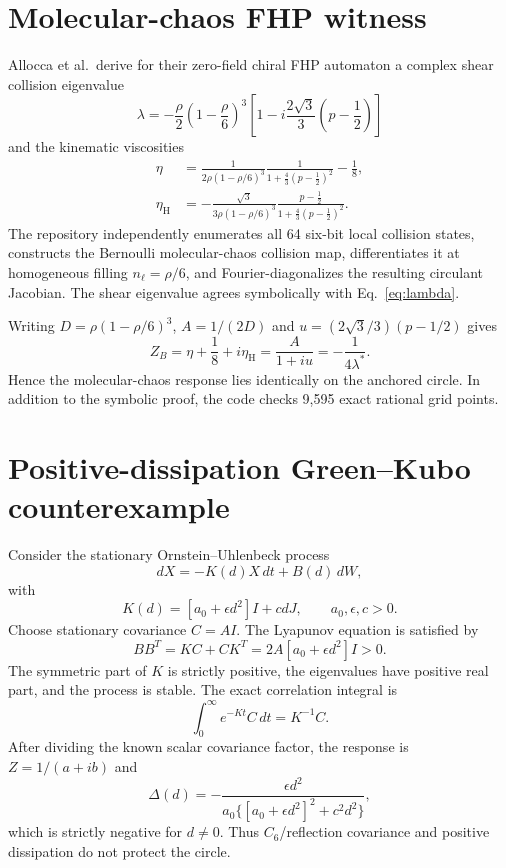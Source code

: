 \documentclass[11pt]{article}
\begin{document}
\section{Molecular-chaos FHP witness}
Allocca et al.~derive for their zero-field chiral FHP automaton a complex shear collision eigenvalue
\begin{equation}
 \lambda=-\frac{\rho}{2}\left(1-\frac{\rho}{6}\right)^3
 \left[1-i\frac{2\sqrt3}{3}\left(p-\frac12\right)\right]
 \label{eq:lambda}
\end{equation}
and the kinematic viscosities
\begin{align}
 \eta&=\frac{1}{2\rho(1-\rho/6)^3}\frac{1}{1+\frac43(p-\frac12)^2}-\frac18,\\
 \eta_{\mathrm H}&=-\frac{\sqrt3}{3\rho(1-\rho/6)^3}
 \frac{p-\frac12}{1+\frac43(p-\frac12)^2}.
\end{align}
The repository independently enumerates all 64 six-bit local collision states, constructs the Bernoulli molecular-chaos collision map, differentiates it at homogeneous filling $n_\ell=\rho/6$, and Fourier-diagonalizes the resulting circulant Jacobian.  The shear eigenvalue agrees symbolically with Eq.~\eqref{eq:lambda}.

Writing $D=\rho(1-\rho/6)^3$, $A=1/(2D)$ and $u=(2\sqrt3/3)(p-1/2)$ gives
\begin{equation}
 Z_B=\eta+\frac18+i\eta_{\mathrm H}=\frac{A}{1+iu}
       =-\frac{1}{4\lambda^*}.
\end{equation}
Hence the molecular-chaos response lies identically on the anchored circle.  In addition to the symbolic proof, the code checks 9,595 exact rational grid points.

\section{Positive-dissipation Green--Kubo counterexample}
Consider the stationary Ornstein--Uhlenbeck process
\begin{equation}
 dX=-K(d)X\,dt+B(d)\,dW,
\end{equation}
with
\begin{equation}
 K(d)=[a_0+\epsilon d^2]I+cdJ,
 \qquad a_0,\epsilon,c>0.
\end{equation}
Choose stationary covariance $C=A I$.  The Lyapunov equation is satisfied by
\begin{equation}
 BB^T=KC+CK^T=2A[a_0+\epsilon d^2]I>0.
\end{equation}
The symmetric part of $K$ is strictly positive, the eigenvalues have positive real part, and the process is stable.  The exact correlation integral is
\begin{equation}
 \int_0^\infty e^{-Kt}C\,dt=K^{-1}C.
\end{equation}
After dividing the known scalar covariance factor, the response is $Z=1/(a+ib)$ and
\begin{equation}
 \Delta(d)=-\frac{\epsilon d^2}
 {a_0\{[a_0+\epsilon d^2]^2+c^2d^2\}},
\end{equation}
which is strictly negative for $d\ne0$.  Thus $C_6$/reflection covariance and positive dissipation do not protect the circle.
\end{document}
